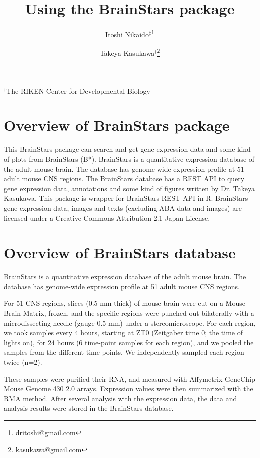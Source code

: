 \documentclass[12pt,fullpage]{article}
\author{Itoshi Nikaido$^\ddagger$\footnote{dritoshi@gmail.com} \and Takeya Kasukawa$^\ddagger$\footnote{kasukawa@gmail.com}}
\begin{document}
\title{Using the BrainStars package}
\maketitle
\begin{center}$^\ddagger$The RIKEN Center for Developmental Biology
\end{center}

\tableofcontents

\section{Overview of BrainStars package}
This BrainStars package can search and get gene expression data
and some kind of plots from BrainStars (B*). BrainStars is a 
quantitative expression database of the adult mouse brain. 
The database has genome-wide expression profile at 51 adult mouse 
CNS regions.  The BrainStars database has a REST API to query gene 
expression data, annotations and some kind of figures written by 
Dr. Takeya Kasukawa.  This package is wrapper for BrainStars REST 
API in R. BrainStars gene expression data, images and texts 
(excluding ABA data and images) are licensed under a Creative 
Commons Attribution 2.1 Japan License.

\section{Overview of BrainStars database}
BrainStars is a quantitative expression database of the adult
mouse brain. The database has genome-wide expression profile at 51
adult mouse CNS regions.

For 51 CNS regions, slices (0.5-mm thick) of mouse brain were cut on a
Mouse Brain Matrix, frozen, and the specific regions were punched out
bilaterally with a microdissecting needle (gauge 0.5 mm) under a
stereomicroscope. For each region, we took samples every 4 hours,
starting at ZT0 (Zeitgaber time 0; the time of lights on), for 24
hours (6 time-point samples for each region), and we pooled the
samples from the different time points. We independently sampled each
region twice (n=2).

These samples were purified their RNA, and measured with Affymetrix
GeneChip Mouse Genome 430 2.0 arrays. Expression values were then
summarized with the RMA method. After several analysis with the
expression data, the data and analysis results were stored in the
BrainStars database.
  
\end{document}
